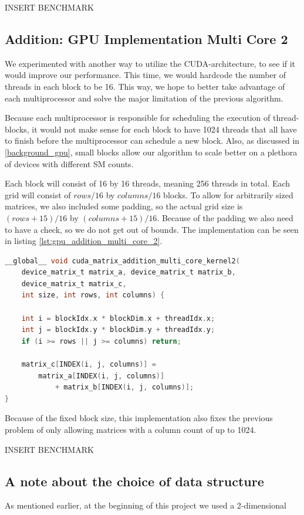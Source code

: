 INSERT BENCHMARK

\subsection{Addition: GPU Implementation Multi Core 2}
We experimented with another way to utilize the CUDA-architecture, to see if it would improve our performance. This time, we would hardcode the number of threads in each block to be 16. This way, we hope to better take advantage of each multiprocessor and solve the major limitation of the previous algorithm.

Because each multiprocessor is responsible for scheduling the execution of thread-blocks, it would not make sense for each block to have 1024 threads that all have to finish before the multiprocessor can schedule a new block. Also, as discussed in \ref{background_gpu}, small blocks allow our algorithm to scale better on a plethora of devices with different SM counts.

Each block will consist of 16 by 16 threads, meaning 256 threads in total. Each grid will consist of $rows / 16$ by $columns / 16$ blocks. To allow for arbitrarily sized matrices, we also included some padding, so the actual grid size is $(rows + 15) / 16$ by $(columns + 15) / 16$. Because of the padding we also need to have a check, so we do not get out of bounds. The implementation can be seen in listing \ref{lst:gpu_addition_multi_core_2}.

\begin{lstlisting}[language=C, caption={GPU addition multi core 2}, label={lst:gpu_addition_multi_core_2}]
__global__ void cuda_matrix_addition_multi_core_kernel2(
    device_matrix_t matrix_a, device_matrix_t matrix_b,
    device_matrix_t matrix_c, 
    int size, int rows, int columns) {
    
    int i = blockIdx.x * blockDim.x + threadIdx.x;
    int j = blockIdx.y * blockDim.y + threadIdx.y;
    if (i >= rows || j >= columns) return;

    matrix_c[INDEX(i, j, columns)] =
        matrix_a[INDEX(i, j, columns)] 
            + matrix_b[INDEX(i, j, columns)];
}
\end{lstlisting}

Because of the fixed block size, this implementation also fixes the previous problem of only allowing matrices with a column count of up to 1024.

INSERT BENCHMARK

\subsection{A note about the choice of data structure}

As mentioned earlier, at the beginning of this project we used a 2-dimensional